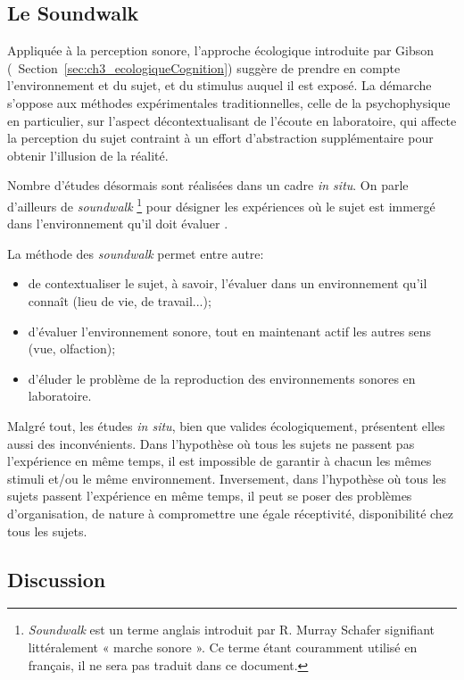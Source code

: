 \subsection{Le Soundwalk}
\label{sec:ch3_soundwalk}

Appliquée à la perception sonore, l'approche écologique introduite par Gibson (\cf~Section~\ref{sec:ch3_ecologiqueCognition}) suggère de prendre en compte l'environnement et du sujet, et du stimulus auquel il est exposé. La démarche s'oppose aux méthodes expérimentales traditionnelles, celle de la psychophysique en particulier, sur l'aspect décontextualisant de l'écoute en laboratoire, qui affecte la perception du sujet contraint à un effort d'abstraction supplémentaire pour obtenir l'illusion de la réalité.

Nombre d'études désormais sont réalisées dans un cadre \emph{in situ}. On parle d'ailleurs de \emph{soundwalk}  \footnote{\emph{Soundwalk} est un terme anglais introduit par R. Murray Schafer \citep{schafer1969new} signifiant littéralement « marche sonore ». Ce terme étant couramment utilisé en français, il ne sera pas traduit dans ce document.} pour désigner les expériences où le sujet est immergé dans l'environnement qu'il doit évaluer \citep{adams2008soundwalking,jeon2013soundwalk}.

La méthode des \emph{soundwalk} permet entre autre:

\begin{itemize}
\item  de contextualiser le sujet, à savoir, l'évaluer dans un environnement qu'il connaît (lieu de vie, de travail...);
\item d'évaluer l'environnement sonore, tout en maintenant actif les autres sens (vue, olfaction);
\item d'éluder le problème de la reproduction des environnements sonores en laboratoire.
\end{itemize}

Malgré tout, les études \emph{in situ}, bien que valides écologiquement, présentent elles aussi des inconvénients. Dans l'hypothèse où tous les sujets ne passent pas l'expérience en même temps, il est impossible de garantir à chacun les mêmes stimuli et/ou le même environnement. Inversement, dans l'hypothèse où tous les sujets passent l'expérience en même temps, il peut se poser des problèmes d'organisation, de nature à compromettre une égale réceptivité, disponibilité chez tous les sujets.

\subsection{Discussion}

